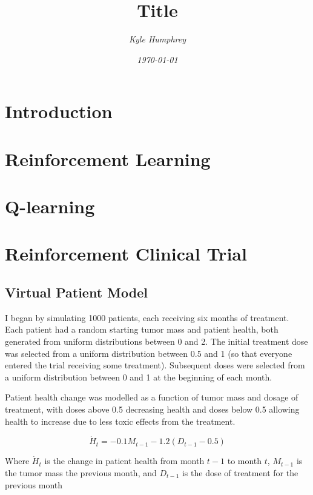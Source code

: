 \documentclass[12pt]{article}
\title{\normalfont \Large Title}
\author{\normalsize \sl Kyle Humphrey}
\date{\normalsize \sl \today}
\begin{document}
\maketitle

\section{Introduction}

\section{Reinforcement Learning} %
\label{sec:reinforcement_learning}


\section{Q-learning} %
\label{sec:q_learning}




\section{Reinforcement Clinical Trial}

\subsection{Virtual Patient Model} %
\label{sub:vpm}

I began by simulating 1000 patients, each receiving six months of treatment. Each patient had a random starting tumor mass and patient health, both generated from uniform distributions between 0 and 2. The initial treatment dose was selected from a uniform distribution between 0.5 and 1 (so that everyone entered the trial receiving some treatment). Subsequent doses were selected from a uniform distribution between 0 and 1 at the beginning of each month.

Patient health change was modelled as a function of tumor mass and dosage of treatment, with doses above 0.5 decreasing health and doses below 0.5 allowing health to increase due to less toxic effects from the treatment.

\[
\dot{H}_{t} = - 0.1 M_{t-1} - 1.2 (D_{t-1} - 0.5)
\]

Where $\dot{H}_{t}$ is the change in patient health from month $t-1$ to month $t$, 
$M_{t-1}$ is the tumor mass the previous month, and 
$D_{t-1}$ is the dose of treatment for the previous month
\end{document}
